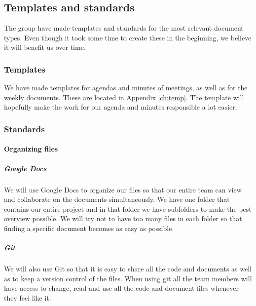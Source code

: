 \subsection{Templates and standards}
The group have made templates and standards for the most relevant document types. Even though it took some time to create these in the beginning, we believe it will benefit us over time.

\subsubsection{Templates}
We have made templates for agendas and minutes of meetings, as well as for the weekly documents. These are located in Appendix \ref{ch:temp}. The template will hopefully make the work for our agenda and minutes responsible a lot easier.

\subsubsection{Standards}

\paragraph{Organizing files}
\subparagraph{Google Docs}\hfill
\newline
We will use Google Docs to organize our files so that our entire team can view and collaborate on the documents simultaneously. We have one folder that contains our entire project and in that folder we have subfolders to make the best overview possible. We will try not to have too many files in each folder so that finding a specific document becomes as easy as possible.

\subparagraph{Git}\hfill 
\newline
We will also use Git so that it is easy to share all the code and documents as well as to keep a version control of the files. When using \gls{git} all the team members will have access to change, read and use all the code and document files whenever they feel like it.

\newpage

